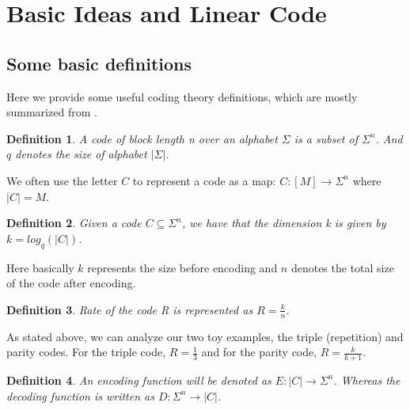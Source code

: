 \documentclass{article}
\newtheorem{Definition}{Definition}
\begin{document}
\section{Basic Ideas and Linear Code}
\subsection{Some basic definitions}

\noindent Here we provide some useful coding theory definitions, which are mostly summarized from \cite{book}.

\begin{Definition}
A code of block length n over an alphabet $\Sigma$ is a subset of $\Sigma ^n$. And $q$ denotes the size of alphabet $|\Sigma|$. \cite{book}
\end{Definition}
\noindent We often use the letter $C$ to represent a code as a map: $C: [M] \rightarrow \Sigma^n$ where $|C| = M$.

\begin{Definition}
Given a code $C \subseteq \Sigma^n$, we have that the dimension k is given by $k = log_q(|C|)$.
\end{Definition}
\noindent Here basically $k$ represents the size before encoding and $n$ denotes the total size of the code after encoding. 
\begin{Definition}
Rate of the code R is represented as $R=\frac{k}{n}$.
\end{Definition}
\noindent As stated above, we can analyze our two toy examples, the triple (repetition) and parity codes.  For the triple code, $R=\frac{1}{3}$ and for the parity code, $R = \frac{k}{k+1}$.
\begin{Definition}
An encoding function will be denoted as $E:|C| \rightarrow \Sigma^n$. Whereas the decoding function is written as $D:\Sigma^n \rightarrow |C|$.
\end{Definition}
\end{document}

